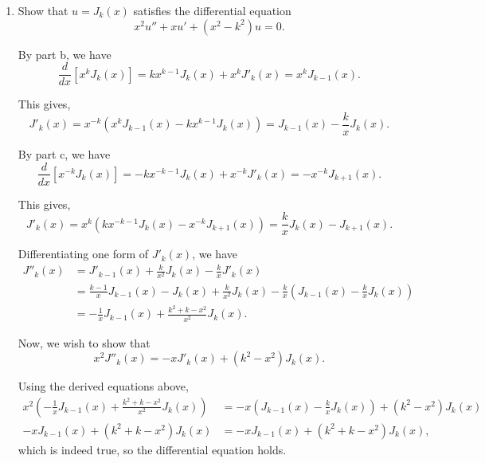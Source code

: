 \documentclass[../hw3]{subfiles}
\begin{document}
\begin{problem}
\begin{enumerate}[label=\alph*)]
	\item Show that $u=J_k(x)$ satisfies the differential equation  \[
		      x^2 u''  +xu' + (x^2-k^2)u = 0
		      .\]

	      By part b, we have \[
		      \frac{d}{dx}[x^k J_k(x)] = kx^{k-1}J_k(x) + x^k J'_k(x) =x^k J_{k-1}(x)
		      .\]

	      This gives, \[
		      J'_k(x)=x^{-k}(x^kJ_{k-1}(x)-kx^{k-1}J_k(x))=J_{k-1}(x)-\frac{k}{x}J_k(x)
		      .\]

	      By part c, we have \[
		      \frac{d}{dx}[x^{-k}J_k(x)]=-kx^{-k-1}J_k(x)+x^{-k}J'_k(x)=-x^{-k}J_{k+1}(x)
		      .\]

	      This gives, \[
		      J'_k(x)=x^k(kx^{-k-1}J_k(x) - x^{-k}J_{k+1}(x)) = \frac{k}{x}J_k(x)-J_{k+1}(x)
		      .\]


	      Differentiating one form of $J'_k(x)$, we have
	      \begin{align*}
		      J''_k(x) & =J'_{k-1}(x)+\frac{k}{x^2}J_k(x)-\frac{k}{x}J'_k(x)                                                         \\
		               & = \frac{k-1}{x}J_{k-1}(x)-J_k(x)+\frac{k}{x^2}J_k(x)-\frac{k}{x}\left( J_{k-1}(x)-\frac{k}{x}J_k(x) \right) \\
		               & = -\frac{1}{x}J_{k-1}(x)+\frac{k^2+k-x^2}{x^2}J_k(x)
		      .\end{align*}

	      Now, we wish to show that  \[
		      x^2J''_k(x)=-x J'_k(x)+(k^2-x^2)J_k(x)
		      .\]

	      Using the derived equations above,
	      \begin{align*}
		      x^2\left(-\frac{1}{x}J_{k-1}(x)+\frac{k^2+k-x^2}{x^2}J_k(x)
		      \right)                            & = -x \left( J_{k-1}(x)-\frac{k}{x}J_k(x) \right) + (k^2-x^2)J_k(x) \\
		      -xJ_{k-1}(x)+(k^2 + k - x^2)J_k(x) & = -x J_{k-1}(x)+ (k^2 + k - x^2)J_k(x)
		      ,\end{align*}
	      which is indeed true, so the differential equation holds.
\end{enumerate}
\end{problem}
\end{document}
